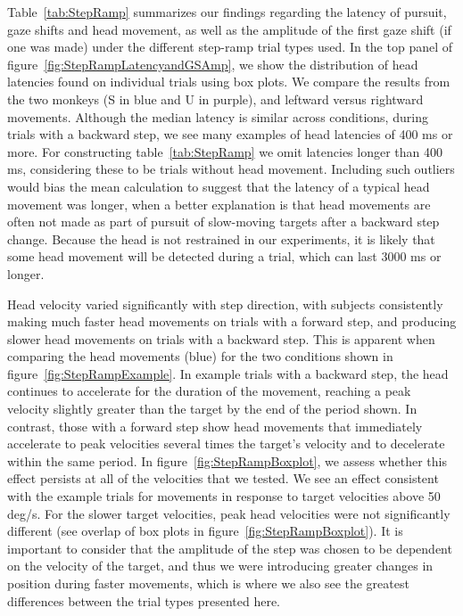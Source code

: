 \documentclass[12pt]{article}
\begin{document}
Table~\ref{tab:StepRamp} summarizes our findings regarding the latency of pursuit, gaze shifts and head movement, as well as the amplitude of the first gaze shift (if one was made) under the different step-ramp trial types used. In the top panel of figure~\ref{fig:StepRampLatencyandGSAmp}, we show the distribution of head latencies found on individual trials using box plots. We compare the results from the two monkeys (S in blue and U in purple), and leftward versus rightward movements. Although the median latency is similar across conditions, during trials with a backward step, we see many examples of head latencies of 400 ms or more. For constructing table~\ref{tab:StepRamp} we omit latencies longer than 400 ms, considering these to be trials without head movement. Including such outliers would bias the mean calculation to suggest that the latency of a typical head movement was longer, when a better explanation is that head movements are often not made as part of pursuit of slow-moving targets after a backward step change. Because the head is not restrained in our experiments, it is likely that some head movement will be detected during a trial, which can last 3000 ms or longer. 

Head velocity varied significantly with step direction, with subjects consistently making much faster head movements on trials with a forward step, and producing slower head movements on trials with a backward step. This is apparent when comparing the head movements (blue) for the two conditions shown in figure~\ref{fig:StepRampExample}. In example trials with a backward step, the head continues to accelerate for the duration of the movement, reaching a peak velocity slightly greater than the target by the end of the period shown. In contrast, those with a forward step show head movements that immediately accelerate to peak velocities several times the target’s velocity and to decelerate within the same period.  In figure~\ref{fig:StepRampBoxplot}, we assess whether this effect persists at all of the velocities that we tested. We see an effect consistent with the example trials for movements in response to target velocities above 50 deg/s. For the slower target velocities, peak head velocities were not significantly different (see overlap of box plots in figure~\ref{fig:StepRampBoxplot}). It is important to consider that the amplitude of the step was chosen to be dependent on the velocity of the target, and thus we were introducing greater changes in position during faster movements, which is where we also see the greatest differences between the trial types presented here.
\end{document}
